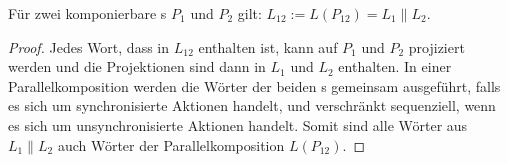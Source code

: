 
\begin{Prop}
  \label{LParallelProp}
  Für zwei komponierbare \MEIO{}s $P_1$ und $P_2$ gilt: $L_{12} := L(P_{12}) =
  L_1\|L_2$.
\end{Prop}
\begin{proof}
  Jedes Wort, dass in $L_{12}$ enthalten ist, kann auf $P_1$ und $P_2$
  projiziert werden und die Projektionen sind dann in $L_1$ und $L_2$
  enthalten. In einer Parallelkomposition werden die Wörter der beiden \MEIO{}s
  gemeinsam ausgeführt, falls es sich um synchronisierte Aktionen handelt, und
  verschränkt sequenziell, wenn es sich um unsynchronisierte Aktionen handelt.
  Somit sind alle Wörter aus $L_1\|L_2$ auch Wörter der Parallelkomposition
  $L(P_{12})$.
\end{proof}


